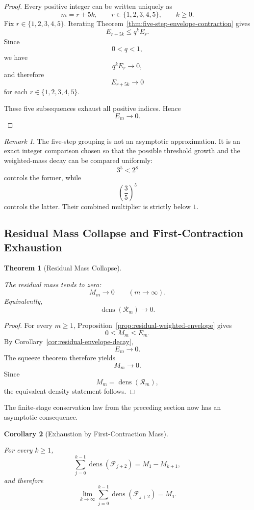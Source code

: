 \documentclass[12pt, oneside]{article}
\numberwithin{equation}{section}
\theoremstyle{definition}
\theoremstyle{plain}
\newtheorem{theorem}{Theorem}[section]
\newtheorem{corollary}[theorem]{Corollary}
\theoremstyle{remark}
\newtheorem*{remark}{Remark}
\begin{document}
\begin{proof}
Every positive integer can be written uniquely as
\[
m=r+5k,
\qquad
r\in\{1,2,3,4,5\},
\qquad
k\ge0.
\]
Fix \(r\in\{1,2,3,4,5\}\). Iterating
Theorem~\ref{thm:five-step-envelope-contraction} gives
\[
E_{r+5k}
\le
q^k E_r.
\]
Since
\[
0<q<1,
\]
we have
\[
q^kE_r\longrightarrow0,
\]
and therefore
\[
E_{r+5k}\longrightarrow0
\]
for each \(r\in\{1,2,3,4,5\}\).

These five subsequences exhaust all positive indices. Hence
\[
E_m\longrightarrow0.
\]
\end{proof}

\begin{remark}
The five-step grouping is not an asymptotic approximation. It is an exact
integer comparison chosen so that the possible threshold growth and the
weighted-mass decay can be compared uniformly:
\[
3^5<2^8
\]
controls the former, while
\[
\left(\frac35\right)^5
\]
controls the latter. Their combined multiplier is strictly below \(1\).
\end{remark}

\subsection{Residual Mass Collapse and First-Contraction Exhaustion}

\begin{theorem}[Residual Mass Collapse]
\label{thm:residual-mass-collapse}

The residual mass tends to zero:
\[
\boxed{
M_m\longrightarrow0
\qquad (m\to\infty).
}
\]
Equivalently,
\[
\operatorname{dens}(\mathcal R_m)\longrightarrow0.
\]
\end{theorem}

\begin{proof}
For every \(m\ge1\),
Proposition~\ref{prop:residual-weighted-envelope} gives
\[
0\le M_m\le E_m.
\]
By Corollary~\ref{cor:residual-envelope-decay},
\[
E_m\longrightarrow0.
\]
The squeeze theorem therefore yields
\[
M_m\longrightarrow0.
\]
Since
\[
M_m=\operatorname{dens}(\mathcal R_m),
\]
the equivalent density statement follows.
\end{proof}

The finite-stage conservation law from the preceding section now has an
asymptotic consequence.

\begin{corollary}[Exhaustion by First-Contraction Mass]
\label{cor:first-contraction-mass-exhaustion}

For every \(k\ge1\),
\[
\sum_{j=0}^{k-1}
\operatorname{dens}(\mathcal F_{j+2})
=
M_1-M_{k+1},
\]
and therefore
\[
\boxed{
\lim_{k\to\infty}
\sum_{j=0}^{k-1}
\operatorname{dens}(\mathcal F_{j+2})
=
M_1.
}
\]
\end{corollary}
\end{document}
